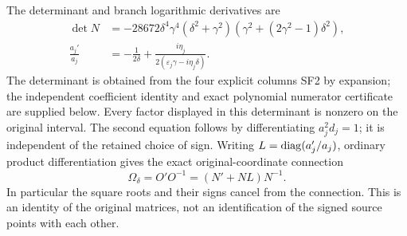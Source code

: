 The determinant and branch logarithmic derivatives are
\begin{align}
 \det N&=-28672\delta^4\gamma^4(\delta^2+\gamma^2)
                         (\gamma^2+(2\gamma^2-1)\delta^2),\nonumber\\
 \frac{a_j'}{a_j}&=-\frac1{2\delta}
       +\frac{i\eta_j}{2(\varepsilon_j\gamma-i\eta_j\delta)}.
 \tag{SF3}
\end{align}
The determinant is obtained from the four explicit columns SF2
by expansion; the independent coefficient identity and exact
polynomial numerator certificate are supplied below. Every factor
displayed in this determinant is nonzero on the original interval.
The second equation follows by differentiating $a_j^2d_j=1$;
it is independent of the retained choice of sign.
Writing $L=\operatorname{diag}(a_j'/a_j)$, ordinary product differentiation gives
the exact original-coordinate connection
\begin{equation}
 \Omega_\delta=O'O^{-1}=(N'+NL)N^{-1}.\tag{SF4}
\end{equation}
In particular the square roots and their signs cancel from the
connection. This is an identity of the original matrices, not an
identification of the signed source points with each other.

